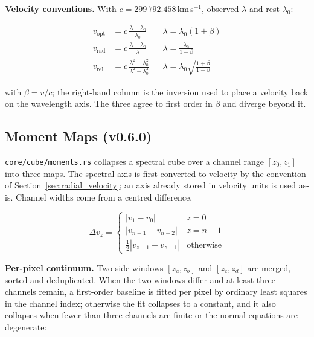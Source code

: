 \documentclass[11pt,a4paper]{article}
\newcommand{\code}[1]{\texttt{\small #1}}
\begin{document}
    \textbf{Velocity conventions.} With $c = 299\,792.458$\,km\,s$^{-1}$, observed $\lambda$ and rest $\lambda_0$:

    \begin{align}
        v_{\text{opt}} &= c \, \frac{\lambda - \lambda_0}{\lambda_0}
            && \lambda = \lambda_0 (1 + \beta) \\[4pt]
        v_{\text{rad}} &= c \, \frac{\lambda - \lambda_0}{\lambda}
            && \lambda = \frac{\lambda_0}{1 - \beta} \\[4pt]
        v_{\text{rel}} &= c \, \frac{\lambda^2 - \lambda_0^2}{\lambda^2 + \lambda_0^2}
            && \lambda = \lambda_0 \sqrt{\frac{1 + \beta}{1 - \beta}}
    \end{align}

    with $\beta = v/c$; the right-hand column is the inversion used to place a velocity back on the wavelength axis. The three agree to first order in $\beta$ and diverge beyond it.

    \subsection{Moment Maps (v0.6.0)}
    \label{sec:moment_maps}

    \code{core/cube/moments.rs} collapses a spectral cube over a channel range $[z_0, z_1]$ into three maps. The spectral axis is first converted to velocity by the convention of Section~\ref{sec:radial_velocity}; an axis already stored in velocity units is used as-is. Channel widths come from a centred difference,

    \begin{equation}
        \Delta v_z = \begin{cases}
            \left| v_1 - v_0 \right| & z = 0 \\[4pt]
            \left| v_{n-1} - v_{n-2} \right| & z = n-1 \\[4pt]
            \tfrac{1}{2}\left| v_{z+1} - v_{z-1} \right| & \text{otherwise}
        \end{cases}
    \end{equation}

    \textbf{Per-pixel continuum.} Two side windows $[z_a, z_b]$ and $[z_c, z_d]$ are merged, sorted and deduplicated. When the two windows differ and at least three channels remain, a first-order baseline is fitted per pixel by ordinary least squares in the channel index; otherwise the fit collapses to a constant, and it also collapses when fewer than three channels are finite or the normal equations are degenerate:
\end{document}
